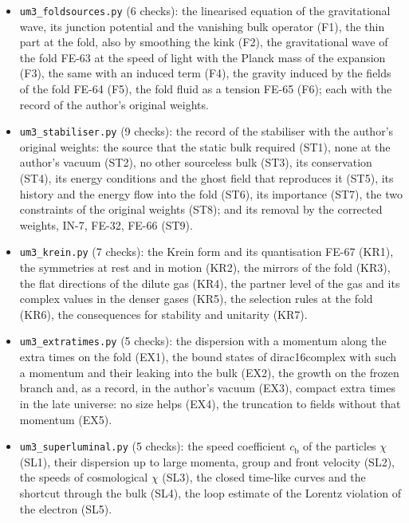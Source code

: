 \documentclass[
  10pt,
]{article}
\begin{document}
\begin{itemize}
  coupling of FE-47 and the binding of \(\chi\), the right-handed
  neutrinos and \(N_{\mathrm{eff}}\) (FE-62), the ad hoc vacuum before
  nucleosynthesis.
\item
  \texttt{um3\_foldsources.py} (6 checks): the linearised equation of
  the gravitational wave, its junction potential and the vanishing bulk
  operator (F1), the thin part at the fold, also by smoothing the kink
  (F2), the gravitational wave of the fold FE-63 at the speed of light
  with the Planck mass of the expansion (F3), the same with an induced
  term (F4), the gravity induced by the fields of the fold FE-64 (F5),
  the fold fluid as a tension FE-65 (F6); each with the record of the
  author's original weights.
\item
  \texttt{um3\_stabiliser.py} (9 checks): the record of the stabiliser
  with the author's original weights: the source that the static bulk
  required (ST1), none at the author's vacuum (ST2), no other sourceless
  bulk (ST3), its conservation (ST4), its energy conditions and the
  ghost field that reproduces it (ST5), its history and the energy flow
  into the fold (ST6), its importance (ST7), the two constraints of the
  original weights (ST8); and its removal by the corrected weights,
  IN-7, FE-32, FE-66 (ST9).
\item
  \texttt{um3\_krein.py} (7 checks): the Krein form and its quantisation
  FE-67 (KR1), the symmetries at rest and in motion (KR2), the mirrors
  of the fold (KR3), the flat directions of the dilute gas (KR4), the
  partner level of the gas and its complex values in the denser gases
  (KR5), the selection rules at the fold (KR6), the consequences for
  stability and unitarity (KR7).
\item
  \texttt{um3\_extratimes.py} (5 checks): the dispersion with a momentum
  along the extra times on the fold (EX1), the bound states of
  dirac16complex with such a momentum and their leaking into the bulk
  (EX2), the growth on the frozen branch and, as a record, in the
  author's vacuum (EX3), compact extra times in the late universe: no
  size helps (EX4), the truncation to fields without that momentum
  (EX5).
\item
  \texttt{um3\_superluminal.py} (5 checks): the speed coefficient
  \(c_{\mathrm{b}}\) of the particles \(\chi\) (SL1), their dispersion
  up to large momenta, group and front velocity (SL2), the speeds of
  cosmological \(\chi\) (SL3), the closed time-like curves and the
  shortcut through the bulk (SL4), the loop estimate of the Lorentz
  violation of the electron (SL5).

\end{itemize}
\end{document}
